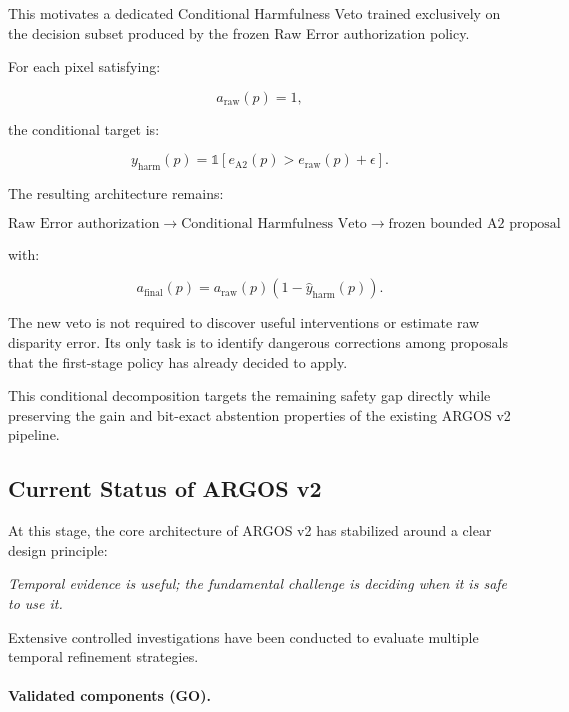 \documentclass[11pt,a4paper]{article}
\begin{document}
This motivates a dedicated Conditional Harmfulness Veto trained exclusively on the decision subset produced by the frozen Raw Error authorization policy.

For each pixel satisfying:

\[
a_{\mathrm{raw}}(p)=1,
\]

the conditional target is:

\[
y_{\mathrm{harm}}(p)
=
\mathbb{1}
\left[
e_{\mathrm{A2}}(p)
>
e_{\mathrm{raw}}(p)+\epsilon
\right].
\]

The resulting architecture remains:

\[
\boxed{
\text{Raw Error authorization}
\rightarrow
\text{Conditional Harmfulness Veto}
\rightarrow
\text{frozen bounded A2 proposal}
}
\]

with:

\[
a_{\mathrm{final}}(p)
=
a_{\mathrm{raw}}(p)
\left(
1-\hat y_{\mathrm{harm}}(p)
\right).
\]

The new veto is not required to discover useful interventions or estimate raw disparity error. Its only task is to identify dangerous corrections among proposals that the first-stage policy has already decided to apply.

This conditional decomposition targets the remaining safety gap directly while preserving the gain and bit-exact abstention properties of the existing ARGOS v2 pipeline.

\subsection{Current Status of ARGOS v2}

At this stage, the core architecture of ARGOS v2 has stabilized around a clear design principle:

\begin{center}
\emph{Temporal evidence is useful; the fundamental challenge is deciding when it is safe to use it.}
\end{center}

Extensive controlled investigations have been conducted to evaluate multiple temporal refinement strategies.

\paragraph{Validated components (GO).}
\end{document}

